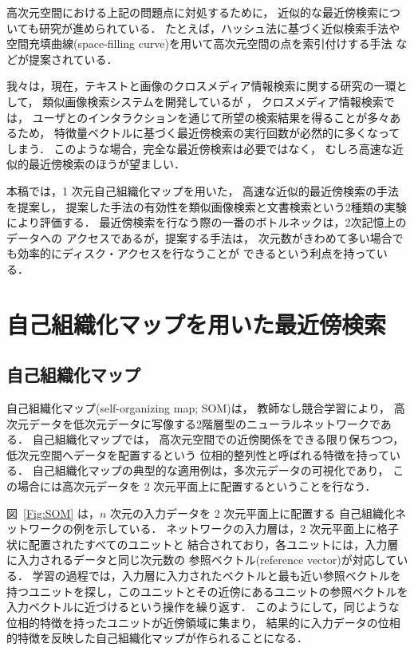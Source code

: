 高次元空間における上記の問題点に対処するために，
近似的な最近傍検索についても研究が進められている．
たとえば，ハッシュ法に基づく近似検索手法\cite{Gionis99}や
空間充填曲線(space-filling curve)を用いて高次元空間の点を索引付けする手法
\cite{Liao00,Shepherd99}などが提案されている．

我々は，現在，テキストと画像のクロスメディア情報検索に関する研究の一環として，
類似画像検索システムを開発しているが
\cite{Koizumi02a,Koizumi02b}，
クロスメディア情報検索では，
ユーザとのインタラクションを通じて所望の検索結果を得ることが多々あるため，
特徴量ベクトルに基づく最近傍検索の実行回数が必然的に多くなってしまう．
このような場合，完全な最近傍検索は必要ではなく，
むしろ高速な近似的最近傍検索のほうが望ましい．

本稿では，1 次元自己組織化マップを用いた，
高速な近似的最近傍検索の手法を提案し，
提案した手法の有効性を類似画像検索と文書検索という2種類の実験により評価する．
最近傍検索を行なう際の一番のボトルネックは，2次記憶上のデータへの
アクセスであるが，提案する手法は，
次元数がきわめて多い場合でも効率的にディスク・アクセスを行なうことが
できるという利点を持っている．


\section{自己組織化マップを用いた最近傍検索}

\subsection{自己組織化マップ}

自己組織化マップ(self-organizing map; SOM)\cite{Kohonen95}は，
教師なし競合学習により，
高次元データを低次元データに写像する2階層型のニューラルネットワークである．
自己組織化マップでは，
高次元空間での近傍関係をできる限り保ちつつ，低次元空間へデータを配置するという
位相的整列性と呼ばれる特徴を持っている．
自己組織化マップの典型的な適用例は，多次元データの可視化であり，
この場合には高次元データを 2 次元平面上に配置するということを行なう\cite{Kohonen00,Oja99}．

図~\ref{Fig:SOM} は，$n$ 次元の入力データを 2 次元平面上に配置する
自己組織化ネットワークの例を示している．
ネットワークの入力層は，2 次元平面上に格子状に配置されたすべてのユニットと
結合されており，各ユニットには，入力層に入力されるデータと同じ次元数の
参照ベクトル(reference vector)が対応している．
学習の過程では，入力層に入力されたベクトルと最も近い参照ベクトルを
持つユニットを探し，このユニットとその近傍にあるユニットの参照ベクトルを
入力ベクトルに近づけるという操作を繰り返す．
このようにして，同じような位相的特徴を持ったユニットが近傍領域に集まり，
結果的に入力データの位相的特徴を反映した自己組織化マップが作られることになる．

